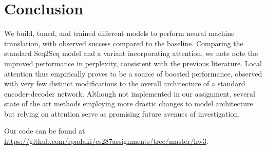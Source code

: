 \documentclass[11pt]{article}
\begin{document}
\section{Conclusion}
We build, tuned, and trained different models to perform neural machine translation, with observed success compared to the baseline. Comparing the standard Seq2Seq model and a variant incorporating attention, we note note the improved performance in perplexity, consistent with the previous literature. Local attention thus empirically proves to be a source of boosted performance, observed with very few distinct modifications to the overall architecture of a standard encoder-decoder network. Although not implemented in our assignment, several state of the art methods employing more drastic changes to model architecture but relying on attention serve as promising future avenues of investigation.






Our code can be found at \url{https://github.com/rpadaki/cs287assignments/tree/master/hw3}.



\end{document}
